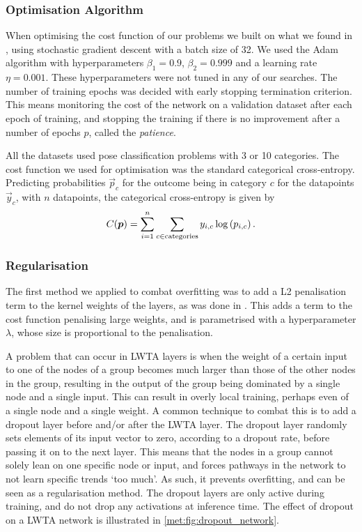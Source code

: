     \subsubsection{Optimisation Algorithm}
        When optimising the cost function of our problems we built on what we found in \citep{Project2}, using stochastic gradient descent with a batch size of 32. We used the Adam algorithm with hyperparameters $\beta_1 = 0.9$, $\beta_2 = 0.999$ and a learning rate $\eta = 0.001$. These hyperparameters were not tuned in any of our searches. The number of training epochs was decided with early stopping termination criterion. This means monitoring the cost of the network on a validation dataset after each epoch of training, and stopping the training if there is no improvement after a number of epochs $p$, called the \textit{patience}.

        All the datasets used pose classification problems with 3 or 10 categories. The cost function we used for optimisation was the standard categorical cross-entropy. Predicting probabilities $\vec{p}_c$ for the outcome being in category $c$ for the datapoints $\vec{y}_c$, with $n$ datapoints, the categorical cross-entropy is given by
        \begin{align}
            C(\boldsymbol{p}) = \sum_{i=1}^n \sum_{c \in \mathrm{categories}} y_{i,c} \log\left(p_{i,c}\right).
        \end{align}

    \subsubsection{Regularisation}
        The first method we applied to combat overfitting was to add a L2 penalisation term to the kernel weights of the layers, as was done in \cite{Project2}. This adds a term to the cost function penalising large weights, and is parametrised with a hyperparameter $\lambda$, whose size is proportional to the penalisation.

        A problem that can occur in LWTA layers is when the weight of a certain input to one of the nodes of a group becomes much larger than those of the other nodes in the group, resulting in the output of the group being dominated by a single node and a single input. This can result in overly local training, perhaps even of a single node and a single weight. A common technique to combat this is to add a dropout layer before and/or after the LWTA layer. The dropout layer randomly sets elements of its input vector to zero, according to a dropout rate, before passing it on to the next layer. This means that the nodes in a group cannot solely lean on one specific node or input, and forces pathways in the network to not learn specific trends `too much'. As such, it prevents overfitting, and can be seen as a regularisation method. The dropout layers are only active during training, and do not drop any activations at inference time. The effect of dropout on a LWTA network is illustrated in \cref{met:fig:dropout_network}.

